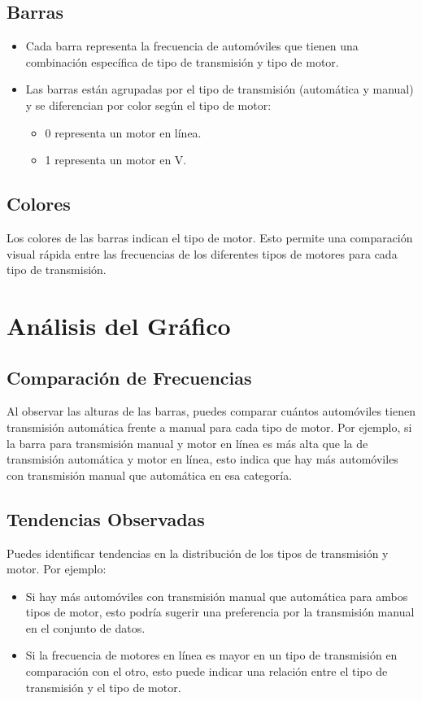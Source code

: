 \documentclass{article}
\begin{document}
\subsection{Barras}
\begin{itemize}
    \item Cada barra representa la frecuencia de automóviles que tienen una combinación específica de tipo de transmisión y tipo de motor.
    \item Las barras están agrupadas por el tipo de transmisión (automática y manual) y se diferencian por color según el tipo de motor:
        \begin{itemize}
            \item 0 representa un motor en línea.
            \item 1 representa un motor en V.
        \end{itemize}
\end{itemize}

\subsection{Colores}
Los colores de las barras indican el tipo de motor. Esto permite una comparación visual rápida entre las frecuencias de los diferentes tipos de motores para cada tipo de transmisión.

\section{Análisis del Gráfico}

\subsection{Comparación de Frecuencias}
Al observar las alturas de las barras, puedes comparar cuántos automóviles tienen transmisión automática frente a manual para cada tipo de motor. Por ejemplo, si la barra para transmisión manual y motor en línea es más alta que la de transmisión automática y motor en línea, esto indica que hay más automóviles con transmisión manual que automática en esa categoría.

\subsection{Tendencias Observadas}
Puedes identificar tendencias en la distribución de los tipos de transmisión y motor. Por ejemplo:
\begin{itemize}
    \item Si hay más automóviles con transmisión manual que automática para ambos tipos de motor, esto podría sugerir una preferencia por la transmisión manual en el conjunto de datos.
    \item Si la frecuencia de motores en línea es mayor en un tipo de transmisión en comparación con el otro, esto puede indicar una relación entre el tipo de transmisión y el tipo de motor.
\end{itemize}
\end{document}
